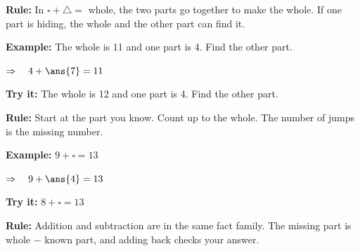 \documentclass[12pt]{article}
\begin{document}


\begin{formulabox}
\textbf{Rule:} In $\square + \triangle = $ whole, the two parts go together
to make the whole. If one part is hiding, the whole and the other part can
find it.
\end{formulabox}

\begin{examplebox}
\textbf{Example:} \quad The whole is 11 and one part is 4. Find the other part.

$\Rightarrow\quad 4 + \ans{7} = 11$
\end{examplebox}

\begin{tryitbox}
\textbf{Try it:} \quad The whole is 12 and one part is 4. Find the other part.\\[2pt]
\end{tryitbox}


\begin{formulabox}
\textbf{Rule:} Start at the part you know. Count up to the whole. The number
of jumps is the missing number.
\end{formulabox}

\begin{examplebox}
\textbf{Example:} \quad $9 + \square = 13$

$\Rightarrow\quad 9 + \ans{4} = 13$
\end{examplebox}

\begin{tryitbox}
\textbf{Try it:} \quad $8 + \square = 13$\\[2pt]
\end{tryitbox}


\begin{formulabox}
\textbf{Rule:} Addition and subtraction are in the same fact family. The
missing part is whole $-$ known part, and adding back checks your answer.
\end{formulabox}
\end{document}
